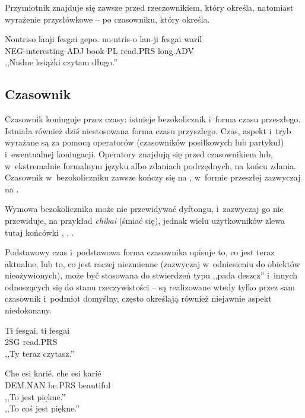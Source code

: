 \begin{spacing}{1.1}
Przymiotnik znajduje się zawsze przed rzeczownikiem, który określa, natomiast
wyrażenie przysłówkowe -- po czasowniku, który określa.

\begin{exe}
	\ex
	\trans Nontriso lanji fesgai gepo.
	\gll  no-ntris-o lan-ji fesgai waril\\
	  NEG-interesting-ADJ book-PL read.PRS long.ADV \\
	\glt  ,,Nudne książki czytam długo.''
\end{exe}

\subsection{Czasownik}

Czasownik koniuguje przez czasy: istnieje bezokolicznik i~forma czasu
przeszłego. Istniała również dziś niestosowana forma czasu przyszłego. Czas,
aspekt i~tryb wyrażane są za pomocą operatorów (czasowników posiłkowych lub
partykuł) i~ewentualnej koniugacji. Operatory znajdują się przed czasownikiem
lub, w~ekstremalnie formalnym języku albo zdaniach podrzędnych, na końcu zdania.
Czasownik w~bezokoliczniku zawsze kończy się na , w~formie przeszłej
zazwyczaj na .

Wymowa bezokolicznika może nie przewidywać dyftongu, i~zazwyczaj go nie
przewiduje, na przykład \emph{chikai}  (śmiać się), jednak wielu
użytkowników zlewa tutaj końcówki , , .

\skipline

Podstawowy czas i~podstawowa forma czasownika opisuje to, co jest teraz
aktualne, lub to, co jest raczej niezmienne (zazwyczaj w~odniesieniu do obiektów
nieożywionych), może być stosowana do stwierdzeń typu ,,pada deszcz'' i~innych
odnoszących się do stanu rzeczywistości -- są realizowane wtedy tylko przez sam
czasownik i~podmiot domyślny, często określają również niejawnie aspekt
niedokonany.

\begin{exe}
	\ex
	\trans Ti fesgai.
	\gll  ti fesgai \\
	  2SG read.PRS \\
	\glt  ,,Ty teraz czytasz.''
\end{exe}

\begin{exe}
	\ex
	\trans Che esi karié.
	\gll  che esi karié \\
	  DEM.NAN be.PRS beautiful \\
	\glt  ,,To jest piękne.'' \\ ,,To coś jest piękne.''
\end{exe}


\end{spacing}
